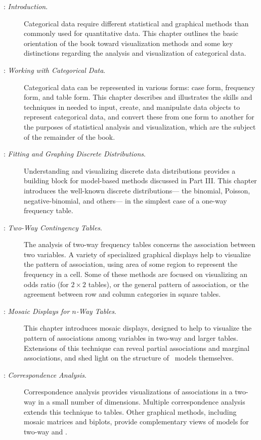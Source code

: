 \begin{description}
\item[: \emph{Introduction}.]
Categorical data require different statistical and graphical methods
than commonly used for quantitative data.
This chapter outlines the basic orientation
of the book toward visualization methods and some key distinctions regarding the
analysis and visualization of categorical data.

\item[: \emph{Working with Categorical Data}.]
Categorical data can be represented in various forms:
case form, frequency form, and table form.  This chapter
describes and illustrates the skills and techniques in \R
needed to input, create, and manipulate \R data objects
to represent categorical data, and convert these from one
form to another for the purposes of statistical analysis
and visualization, which are the subject of the remainder of the book.

\item[: \emph{Fitting and Graphing Discrete Distributions}.]
Understanding and visualizing discrete data distributions provides a
building block for model-based methods discussed in Part III.
This chapter introduces the well-known discrete distributions---
the binomial, Poisson, negative-binomial, and others---
in the simplest case of a one-way frequency table.

\item[: \emph{Two-Way Contingency Tables}.]
The analysis of two-way frequency tables concerns the association
between two variables.  A variety of specialized graphical
displays help to visualize the pattern of association,
using area of some region to represent the frequency in a cell.
Some of these methods are focused
on visualizing an odds ratio (for $2 \times 2$ tables), or the general
pattern of association, or the agreement between row and column
categories in square tables.

\item[: \emph{Mosaic Displays for $n$-Way Tables}.]
This chapter introduces mosaic displays, designed to
help to visualize the pattern of associations
among variables in two-way and larger tables.  
Extensions of
this technique can reveal partial associations and marginal associations,
and shed light on the structure of \loglin\ models themselves.

\item[: \emph{Correspondence Analysis}.]
Correspondence analysis provides visualizations of associations in a two-way \ctab
in a small number of dimensions.
Multiple correspondence analysis extends this technique to \nway
tables.  Other graphical methods, including mosaic matrices and biplots,
provide complementary views of \loglin models for two-way and \nway
\ctabs.


\end{description}
